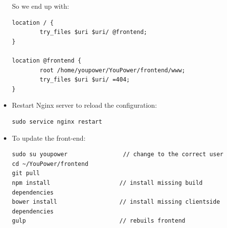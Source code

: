 \begin{itemize}
So we end up with:

\begin{lstlisting}
location / {
        try_files $uri $uri/ @frontend;
}

location @frontend {
        root /home/youpower/YouPower/frontend/www;
        try_files $uri $uri/ =404;
}
\end{lstlisting} 

\item Restart Nginx server to reload the configuration:
\begin{lstlisting}
sudo service nginx restart
\end{lstlisting} 

\item To update the front-end:
\begin{lstlisting}
sudo su youpower                // change to the correct user
cd ~/YouPower/frontend
git pull
npm install                    // install missing build dependencies
bower install                  // install missing clientside dependencies
gulp                           // rebuils frontend
\end{lstlisting} 


\end{itemize}